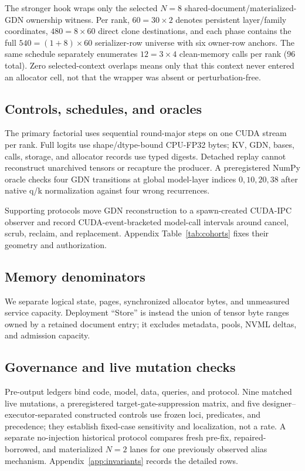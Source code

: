 \documentclass{article}
\begin{document}
The stronger hook wraps only the selected $N=8$
shared-document/materialized-GDN ownership witness.  Per rank,
$60=30\times2$ denotes persistent layer/family coordinates,
$480=8\times60$ direct clone destinations, and each phase contains the full
$540=(1+8)\times60$ serializer-row universe with six owner-row anchors.  The
same schedule separately enumerates $12=3\times4$ clean-memory calls per rank
(96 total).  Zero selected-context overlaps means only that this context never
entered an allocator cell, not that the wrapper was absent or perturbation-free.

\subsection{Controls, schedules, and oracles}

The primary factorial uses sequential round-major steps on one CUDA stream per
rank.  Full logits use shape/dtype-bound CPU-FP32 bytes; KV, GDN, bases, calls,
storage, and allocator records use typed digests.  Detached replay cannot
reconstruct unarchived tensors or recapture the producer.  A preregistered
NumPy oracle checks four GDN transitions at global model-layer indices
$0,10,20,38$ after native q/k normalization against four wrong recurrences.

Supporting protocols move GDN reconstruction to a spawn-created CUDA-IPC
observer and record CUDA-event-bracketed model-call intervals around cancel,
scrub, reclaim, and replacement.  Appendix Table~\ref{tab:cohorts} fixes their
geometry and authorization.

\subsection{Memory denominators}
\label{sec:denominators}

We separate logical state, pages, synchronized allocator bytes, and unmeasured
service capacity.  Deployment ``Store'' is instead the union of tensor byte
ranges owned by a retained document entry; it excludes metadata, pools, NVML
deltas, and admission capacity.

\subsection{Governance and live mutation checks}

Pre-output ledgers bind code, model, data, queries, and protocol.  Nine matched
live mutations, a preregistered target-gate-suppression matrix, and five
designer--executor-separated constructed controls use frozen loci, predicates,
and precedence; they establish fixed-case sensitivity and localization, not a
rate.  A separate no-injection historical protocol compares fresh pre-fix,
repaired-borrowed, and materialized $N=2$ lanes for one previously observed
alias mechanism.  Appendix~\ref{app:invariants} records the detailed rows.
\end{document}
